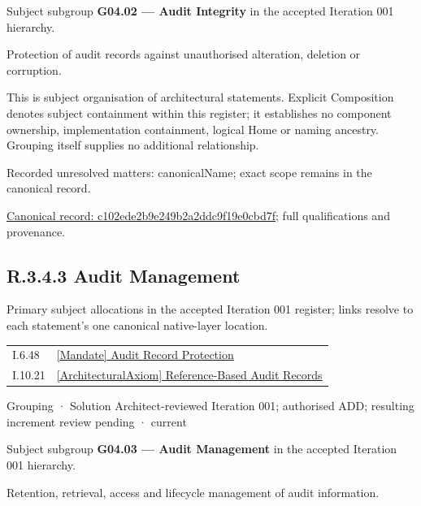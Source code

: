Subject subgroup \textbf{G04.02 — Audit Integrity} in the accepted Iteration 001 hierarchy.



Protection of audit records against unauthorised alteration, deletion or corruption.



This is subject organisation of architectural statements. Explicit Composition denotes subject containment within this register; it establishes no component ownership, implementation containment, logical Home or naming ancestry. Grouping itself supplies no additional relationship.


{\small Recorded unresolved matters: canonicalName; exact scope remains in the canonical record.}\par
{\footnotesize \href{../../../../continuum/grouping/c102ede2b9e249b2a2ddc9f19e0cbd7f.md}{Canonical record: c102ede2b9e249b2a2ddc9f19e0cbd7f}; full qualifications and provenance.}\par
\subsection*{R.3.4.3 Audit Management}
\label{navigation:R.3.4.3}

Primary subject allocations in the accepted Iteration 001 register; links resolve to each statement’s one canonical native-layer location.\par
\begin{longtable}{p{.22\linewidth}p{.73\linewidth}}
I.6.48 & \hyperref[element:de15359269cf45adb646a435c18306f8]{[Mandate] Audit Record Protection} \\
I.10.21 & \hyperref[element:9202f9b1adf84d4882a507a2d7280710]{[ArchitecturalAxiom] Reference-Based Audit Records} \\
\end{longtable}
\label{element:de791c4976f84676bf8545b1cfb8bf41}
{\small Grouping · Solution Architect-reviewed Iteration 001; authorised ADD; resulting increment review pending · current}\par

Subject subgroup \textbf{G04.03 — Audit Management} in the accepted Iteration 001 hierarchy.



Retention, retrieval, access and lifecycle management of audit information.



